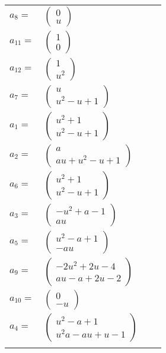 \documentclass[1p]{elsarticle_modified}
\theoremstyle{definition}
\begin{document}
\begin{tabular}{m{7pt} m{180pt} m{7pt} m{180pt} }
\flushright $a_{8}=$&$\begin{pmatrix}0\\u\end{pmatrix}$ \\
\flushright $a_{11}=$&$\begin{pmatrix}1\\0\end{pmatrix}$ \\
\flushright $a_{12}=$&$\begin{pmatrix}1\\u^2\end{pmatrix}$ \\
\flushright $a_{7}=$&$\begin{pmatrix}u\\u^2- u+1\end{pmatrix}$ \\
\flushright $a_{1}=$&$\begin{pmatrix}u^2+1\\u^2- u+1\end{pmatrix}$ \\
\flushright $a_{2}=$&$\begin{pmatrix}a\\a u+u^2- u+1\end{pmatrix}$ \\
\flushright $a_{6}=$&$\begin{pmatrix}u^2+1\\u^2- u+1\end{pmatrix}$ \\
\flushright $a_{3}=$&$\begin{pmatrix}- u^2+a-1\\a u\end{pmatrix}$ \\
\flushright $a_{5}=$&$\begin{pmatrix}u^2- a+1\\- a u\end{pmatrix}$ \\
\flushright $a_{9}=$&$\begin{pmatrix}-2 u^2+2 u-4\\a u- a+2 u-2\end{pmatrix}$ \\
\flushright $a_{10}=$&$\begin{pmatrix}0\\- u\end{pmatrix}$ \\
\flushright $a_{4}=$&$\begin{pmatrix}u^2- a+1\\u^2 a- a u+u-1\end{pmatrix}$\\&\end{tabular}
\end{document}
